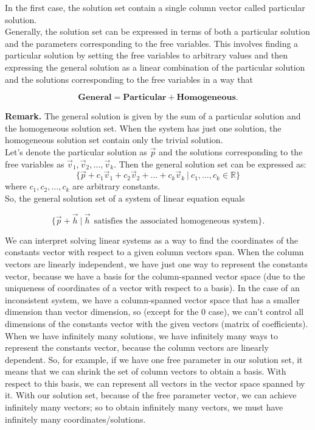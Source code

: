 In the first case, the solution set contain a single column vector called particular solution.
\\

Generally, the solution set can be expressed in terms of both a particular solution and the parameters corresponding to the free variables. This involves finding a particular solution by setting the free variables to arbitrary values and then expressing the general solution as a linear combination of the particular solution and the solutions corresponding to the free variables in a way that

$$
\textbf{General} = \textbf{Particular} + \textbf{Homogeneous}.
$$

\textbf{Remark.} The general solution is given by the sum of a particular solution and the homogeneous solution set. When the system has just one solution, the homogeneous solution set contain only the trivial solution.
\\

Let's denote the particular solution as \( \vec{p} \) and the solutions corresponding to the free variables as \( \vec{v}_1, \vec{v}_2, \ldots, \vec{v}_k \). Then the general solution set can be expressed as:
\[
\{\vec{p} + c_1\vec{v}_1 + c_2\vec{v}_2 + \ldots + c_k\vec{v}_k \ | \ c_1,\dots,c_k \in \mathbb R \}
\]
where \( c_1, c_2, \ldots, c_k \) are arbitrary constants.
\\

So, the general solution set of a system of linear equation equals

$$
\{\vec p + \vec h \ | \  \vec h \ \ \text{satisfies the associated homogeneous system}\}.
$$

We can interpret solving linear systems as a way to find the coordinates of the constants vector with respect to a given column vectors span. When the column vectors are linearly independent, we have just one way to represent the constants vector, because we have a basis for the column-spanned vector space (due to the uniqueness of coordinates of a vector with respect to a basis). In the case of an inconsistent system, we have a column-spanned vector space that has a smaller dimension than vector dimension, so (except for the 0 case), we can't control all dimensions of the constants vector with the given vectors (matrix of coefficients). When we have infinitely many solutions, we have infinitely many ways to represent the constants vector, because the column vectors are linearly dependent. So, for example, if we have one free parameter in our solution set, it means that we can shrink the set of column vectors to obtain a basis. With respect to this basis, we can represent all vectors in the vector space spanned by it. With our solution set, because of the free parameter vector, we can achieve infinitely many vectors; so to obtain infinitely many vectors, we must have infinitely many coordinates/solutions.